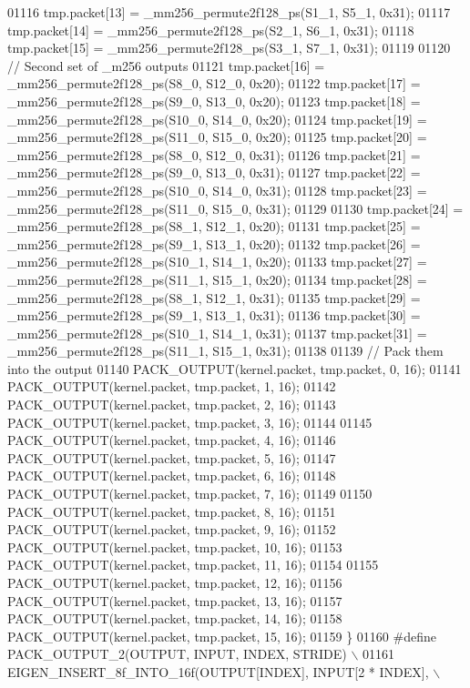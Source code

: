 \begin{DoxyCode}
01116   tmp.packet[13] = \_mm256\_permute2f128\_ps(S1\_1, S5\_1, 0x31);
01117   tmp.packet[14] = \_mm256\_permute2f128\_ps(S2\_1, S6\_1, 0x31);
01118   tmp.packet[15] = \_mm256\_permute2f128\_ps(S3\_1, S7\_1, 0x31);
01119 
01120   \textcolor{comment}{// Second set of \_m256 outputs}
01121   tmp.packet[16] = \_mm256\_permute2f128\_ps(S8\_0, S12\_0, 0x20);
01122   tmp.packet[17] = \_mm256\_permute2f128\_ps(S9\_0, S13\_0, 0x20);
01123   tmp.packet[18] = \_mm256\_permute2f128\_ps(S10\_0, S14\_0, 0x20);
01124   tmp.packet[19] = \_mm256\_permute2f128\_ps(S11\_0, S15\_0, 0x20);
01125   tmp.packet[20] = \_mm256\_permute2f128\_ps(S8\_0, S12\_0, 0x31);
01126   tmp.packet[21] = \_mm256\_permute2f128\_ps(S9\_0, S13\_0, 0x31);
01127   tmp.packet[22] = \_mm256\_permute2f128\_ps(S10\_0, S14\_0, 0x31);
01128   tmp.packet[23] = \_mm256\_permute2f128\_ps(S11\_0, S15\_0, 0x31);
01129 
01130   tmp.packet[24] = \_mm256\_permute2f128\_ps(S8\_1, S12\_1, 0x20);
01131   tmp.packet[25] = \_mm256\_permute2f128\_ps(S9\_1, S13\_1, 0x20);
01132   tmp.packet[26] = \_mm256\_permute2f128\_ps(S10\_1, S14\_1, 0x20);
01133   tmp.packet[27] = \_mm256\_permute2f128\_ps(S11\_1, S15\_1, 0x20);
01134   tmp.packet[28] = \_mm256\_permute2f128\_ps(S8\_1, S12\_1, 0x31);
01135   tmp.packet[29] = \_mm256\_permute2f128\_ps(S9\_1, S13\_1, 0x31);
01136   tmp.packet[30] = \_mm256\_permute2f128\_ps(S10\_1, S14\_1, 0x31);
01137   tmp.packet[31] = \_mm256\_permute2f128\_ps(S11\_1, S15\_1, 0x31);
01138 
01139   \textcolor{comment}{// Pack them into the output}
01140   PACK\_OUTPUT(kernel.packet, tmp.packet, 0, 16);
01141   PACK\_OUTPUT(kernel.packet, tmp.packet, 1, 16);
01142   PACK\_OUTPUT(kernel.packet, tmp.packet, 2, 16);
01143   PACK\_OUTPUT(kernel.packet, tmp.packet, 3, 16);
01144 
01145   PACK\_OUTPUT(kernel.packet, tmp.packet, 4, 16);
01146   PACK\_OUTPUT(kernel.packet, tmp.packet, 5, 16);
01147   PACK\_OUTPUT(kernel.packet, tmp.packet, 6, 16);
01148   PACK\_OUTPUT(kernel.packet, tmp.packet, 7, 16);
01149 
01150   PACK\_OUTPUT(kernel.packet, tmp.packet, 8, 16);
01151   PACK\_OUTPUT(kernel.packet, tmp.packet, 9, 16);
01152   PACK\_OUTPUT(kernel.packet, tmp.packet, 10, 16);
01153   PACK\_OUTPUT(kernel.packet, tmp.packet, 11, 16);
01154 
01155   PACK\_OUTPUT(kernel.packet, tmp.packet, 12, 16);
01156   PACK\_OUTPUT(kernel.packet, tmp.packet, 13, 16);
01157   PACK\_OUTPUT(kernel.packet, tmp.packet, 14, 16);
01158   PACK\_OUTPUT(kernel.packet, tmp.packet, 15, 16);
01159 \}
01160 \textcolor{preprocessor}{#define PACK\_OUTPUT\_2(OUTPUT, INPUT, INDEX, STRIDE)         \(\backslash\)}
01161 \textcolor{preprocessor}{  EIGEN\_INSERT\_8f\_INTO\_16f(OUTPUT[INDEX], INPUT[2 * INDEX], \(\backslash\)}

\end{DoxyCode}
